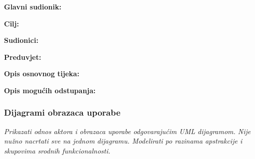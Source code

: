 					\noindent {}
					\begin{packed_item}
						
						\item \textbf{Glavni sudionik: }
						\item  \textbf{Cilj:} 
						\item  \textbf{Sudionici:} 
						\item  \textbf{Preduvjet:} 
						\item  \textbf{Opis osnovnog tijeka:}
						
						\item[] \begin{packed_enum}
							
							\item 
							\item 
							\item 
							\item 
							\item 
						\end{packed_enum}
						
						\item  \textbf{Opis mogućih odstupanja:}
						
						\item[] \begin{packed_item}
							
							\item[2.a] 
							\item[] \begin{packed_enum}
								
								\item 
								\item
								
							\end{packed_enum}
							\item[2.b] 
							\item[3.a] 
							
						\end{packed_item}
					\end{packed_item}
					
					
				\subsubsection{Dijagrami obrazaca uporabe}
					
					\textit{Prikazati odnos aktora i obrazaca uporabe odgovarajućim UML dijagramom. Nije nužno nacrtati sve na jednom dijagramu. Modelirati po razinama apstrakcije i skupovima srodnih funkcionalnosti.}
				\eject		
				
